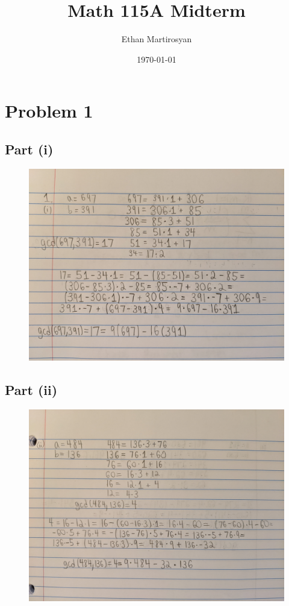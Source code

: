 \documentclass[12pt]{article}
\begin{document}
 
\title{Math 115A Midterm}
\author{Ethan Martirosyan}
\date{\today}
\maketitle
{}
\hfuzz=50pt
\section*{Problem 1}
\subsection*{Part (i)}
\begin{figure}[H]
\centering
\includegraphics[width=\textwidth]{Problem1Image1}
\end{figure}
\newpage
\subsection*{Part (ii)}
 \begin{figure}[H]
\centering
\includegraphics[width=\textwidth]{Problem1Image2}
\end{figure}
\newpage
\end{document}
